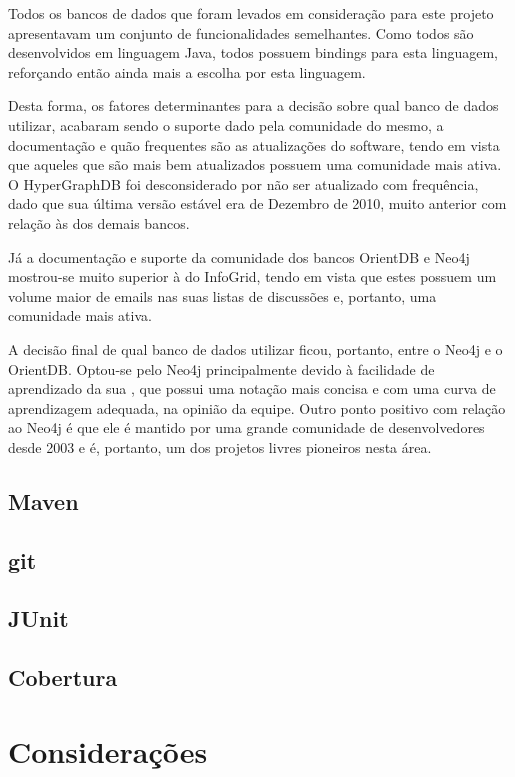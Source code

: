 Todos os bancos de dados que foram levados em consideração para este projeto apresentavam um conjunto de funcionalidades semelhantes.
Como todos são desenvolvidos em linguagem Java, todos possuem bindings para esta linguagem, reforçando então ainda mais a escolha por esta linguagem.

Desta forma, os fatores determinantes para a decisão sobre qual banco de dados utilizar, acabaram sendo o suporte dado pela comunidade do mesmo, a documentação e quão frequentes são as atualizações do software, tendo em vista que aqueles que são mais bem atualizados possuem uma comunidade mais ativa.
O HyperGraphDB foi desconsiderado por não ser atualizado com frequência, dado que sua última versão estável era de Dezembro de 2010, muito anterior com relação às dos demais bancos.

Já a documentação e suporte da comunidade dos bancos OrientDB e Neo4j mostrou-se muito superior à do InfoGrid, tendo em vista que estes possuem um volume maior de emails nas suas listas de discussões e, portanto, uma comunidade mais ativa.

A decisão final de qual banco de dados utilizar ficou, portanto, entre o Neo4j e o OrientDB.
Optou-se pelo Neo4j principalmente devido à facilidade de aprendizado da sua , que possui uma notação mais concisa e com uma curva de aprendizagem adequada, na opinião da equipe.
Outro ponto positivo com relação ao Neo4j é que ele é mantido por uma grande comunidade de desenvolvedores desde 2003 e é, portanto, um dos projetos livres pioneiros nesta área.

\subsection{Maven}

\subsection{git}\label{met:git}

\subsection{JUnit}

\subsection{Cobertura}\label{met:Cobertura}

\section{Considerações}

